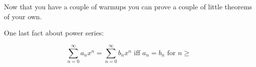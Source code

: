 \newpage







\newpage
Now that you have a couple of warmups you can prove
a couple of little theorems of your own.









\newpage
One last fact about power series:

\[
\sum_{n = 0}^\infty a_nx^n =
\sum_{n = 0}^\infty b_nx^n
\text{ iff }
a_n = b_n \text{ for } n \geq 
\]
